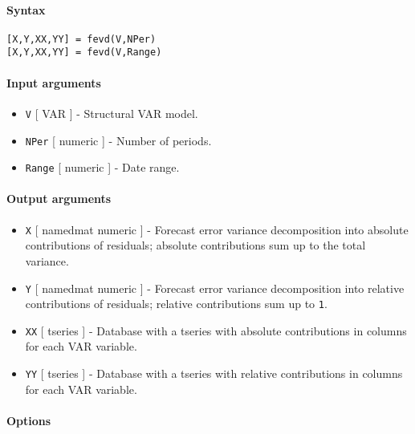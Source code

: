 


	\paragraph{Syntax}\label{syntax}

\begin{verbatim}
[X,Y,XX,YY] = fevd(V,NPer)
[X,Y,XX,YY] = fevd(V,Range)
\end{verbatim}

\paragraph{Input arguments}\label{input-arguments}

\begin{itemize}
\item
  \texttt{V} {[} VAR {]} - Structural VAR model.
\item
  \texttt{NPer} {[} numeric {]} - Number of periods.
\item
  \texttt{Range} {[} numeric {]} - Date range.
\end{itemize}

\paragraph{Output arguments}\label{output-arguments}

\begin{itemize}
\item
  \texttt{X} {[} namedmat \textbar{} numeric {]} - Forecast error
  variance decomposition into absolute contributions of residuals;
  absolute contributions sum up to the total variance.
\item
  \texttt{Y} {[} namedmat \textbar{} numeric {]} - Forecast error
  variance decomposition into relative contributions of residuals;
  relative contributions sum up to \texttt{1}.
\item
  \texttt{XX} {[} tseries {]} - Database with a tseries with absolute
  contributions in columns for each VAR variable.
\item
  \texttt{YY} {[} tseries {]} - Database with a tseries with relative
  contributions in columns for each VAR variable.
\end{itemize}

\paragraph{Options}\label{options}

